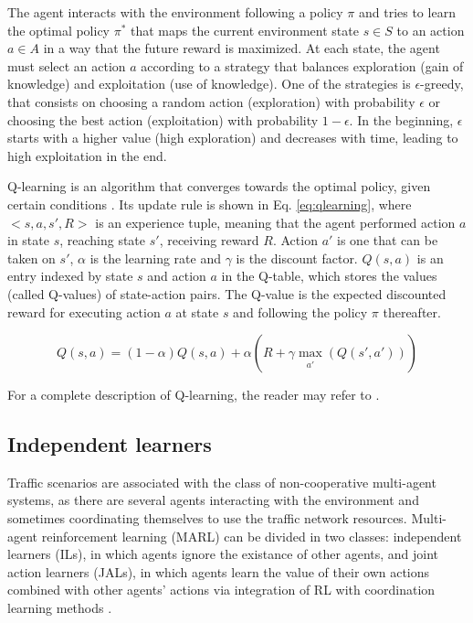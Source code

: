 \documentclass{RITA}
\begin{document}
The agent interacts with the environment following a policy $\pi$ and tries to learn the optimal policy $\pi^*$ that maps the current environment state $s \in S$ to an action $a \in A$ in a way that the future reward is maximized. At each state, the agent must select an action $a$ according to a strategy that balances exploration (gain of knowledge) and exploitation (use of knowledge). One of the strategies is $\epsilon$-greedy, that consists on choosing a random action (exploration) with probability $\epsilon$ or choosing the best action (exploitation) with probability $1 - \epsilon$. In the beginning, $\epsilon$ starts with a higher value (high exploration) and decreases with time, leading to high exploitation in the end.

Q-learning is an algorithm that converges towards the optimal policy, given certain conditions \cite{Watkins&Dayan1992}. Its update rule is shown in Eq. \eqref{eq:qlearning}, where $<s,a,s',R>$ is an experience tuple, meaning that the agent performed action $a$ in state $s$, reaching state $s'$, receiving reward $R$. Action $a'$ is one that can be taken on $s'$, $\alpha$ is the learning rate and $\gamma$ is the discount factor. $Q(s,a)$ is an entry indexed by state $s$ and action $a$ in the Q-table, which stores the values (called Q-values) of state-action pairs. The Q-value is the expected discounted reward for executing action $a$ at
state $s$ and following the policy $\pi$ thereafter.

\begin{equation}
\label{eq:qlearning}
Q(s,a) = (1 - \alpha) Q(s,a) + \alpha (R + \gamma \max_{\substack{a'}}(Q(s',a')))
\end{equation}

For a complete description of Q-learning, the reader may refer to \cite{Watkins&Dayan1992}.



\subsection{Independent learners} 
Traffic scenarios are associated with the class of non-cooperative multi-agent systems, as there are several agents interacting with the environment and sometimes coordinating themselves to use the traffic network resources. Multi-agent reinforcement learning (MARL) can be divided in two classes: independent learners (ILs), in which agents ignore the existance of other agents, and joint action learners (JALs), in which agents learn the value of their own actions combined with other agents' actions via integration of RL with coordination learning methods \cite{Claus&Boutilier1998}. 
\end{document}
